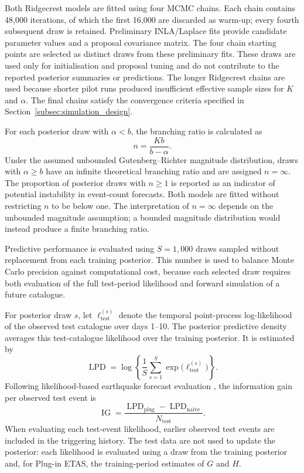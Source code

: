 \documentclass{statsmsc}
\begin{document}
Both Ridgecrest models are fitted using four MCMC chains. Each chain contains
48,000 iterations, of which the first 16,000 are discarded as warm-up; every
fourth subsequent draw is retained. Preliminary INLA/Laplace fits provide
candidate parameter values and a proposal covariance matrix. The four chain starting points are selected as distinct draws from these
preliminary fits. These draws are used only for initialisation and proposal tuning and do
not contribute to the reported posterior summaries or predictions. The
longer Ridgecrest chains are used because shorter pilot runs produced
insufficient effective sample sizes for \(K\) and \(\alpha\). The final
chains satisfy the convergence criteria specified in
Section~\ref{subsec:simulation_design}.

For each posterior draw with \(\alpha<b\), the branching ratio is calculated
as
\[
n=\frac{Kb}{b-\alpha}.
\]
Under the assumed unbounded Gutenberg--Richter magnitude distribution, draws
with \(\alpha\geq b\) have an infinite theoretical branching ratio and are
assigned \(n=\infty\). The proportion of posterior draws with \(n\geq1\) is
reported as an indicator of potential instability in event-count forecasts.
Both models are fitted without restricting \(n\) to be below one. The
interpretation of \(n=\infty\) depends on the unbounded magnitude assumption;
a bounded magnitude distribution would instead produce a finite branching
ratio.

Predictive performance is evaluated using \(S=1,000\) draws sampled without
replacement from each training posterior. This number is used to balance
Monte Carlo precision against computational cost, because each selected draw
requires both evaluation of the full test-period likelihood and forward
simulation of a future catalogue.

For posterior draw \(s\), let
\(\ell_{\mathrm{test}}^{(s)}\) denote the temporal point-process
log-likelihood of the observed test catalogue over days 1--10. The posterior
predictive density averages this test-catalogue likelihood over the training
posterior. It is estimated by
\[
\operatorname{LPD}
=
\log\left\{
\frac{1}{S}\sum_{s=1}^{S}
\exp\bigl(\ell_{\mathrm{test}}^{(s)}\bigr)
\right\}.
\]
Following likelihood-based earthquake forecast evaluation
\citep[e.g.][]{mizrahi2021}, the information gain per observed test event is
\[
\operatorname{IG}
=
\frac{
\operatorname{LPD}_{\mathrm{plug}}
-
\operatorname{LPD}_{\mathrm{naive}}
}{
N_{\mathrm{test}}
}.
\]
When evaluating each test-event likelihood, earlier observed test events are
included in the triggering history. The test data are not used to update the
posterior: each likelihood is evaluated using a draw from the training
posterior and, for Plug-in ETAS, the training-period estimates of \(G\) and \(H\).
\end{document}
